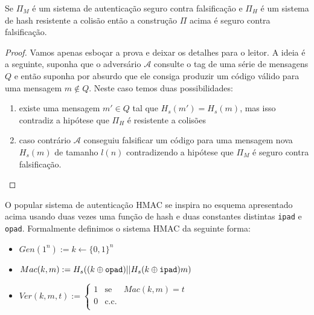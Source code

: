 \begin{theorem}
  Se $\Pi_M$ é um sistema de autenticação seguro contra falsificação e $\Pi_H$ é um sistema de hash resistente a colisão então a construção $\Pi$ acima é seguro contra falsificação. 
\end{theorem}

\begin{proof}
  Vamos apenas esboçar a prova e deixar os detalhes para o leitor.
  A ideia é a seguinte, suponha que o adversário $\mathcal{A}$ consulte o tag de uma série de mensagens $Q$ e então suponha por absurdo que ele consiga produzir um código válido para uma mensagem $m \notin Q$.
  Neste caso temos duas possibilidades:
  \begin{enumerate}
  \item existe uma mensagem $m' \in Q$ tal que $H_s(m') = H_s(m)$, mas isso contradiz a hipótese que $\Pi_H$ é resistente a colisões
  \item caso contrário $\mathcal{A}$ conseguiu falsificar um código para uma mensagem nova $H_s(m)$ de tamanho $l(n)$ contradizendo a hipótese que $\Pi_M$ é seguro contra falsificação.
  \end{enumerate}
\end{proof}

O popular sistema de autenticação HMAC se inspira no esquema apresentado acima usando duas vezes uma função de hash e duas constantes distintas {\tt ipad} e {\tt opad}.
Formalmente definimos o sistema HMAC da seguinte forma:
\begin{itemize}
\item $Gen(1^n) := k \leftarrow \{0,1\}^n$
\item $Mac(k, m) := H_s((k \oplus \textrm{\tt opad}) || H_s(k \oplus \textrm{\tt ipad})m)$
\item $Ver(k, m, t) := \left\{
    \begin{array}{lcl}
      1 & \textrm{se} & Mac(k,m) = t\\
      0 & \textrm{c.c.} &\\
    \end{array}
    \right.$
\end{itemize}




